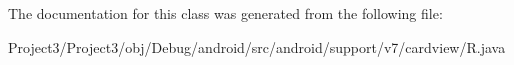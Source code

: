The documentation for this class was generated from the following file\+:\begin{DoxyCompactItemize}
\item 
Project3/\+Project3/obj/\+Debug/android/src/android/support/v7/cardview/R.\+java\end{DoxyCompactItemize}
